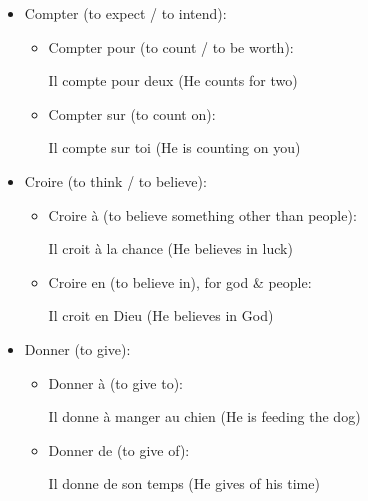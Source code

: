 \documentclass{book}
\begin{document}
\begin{itemize}
            \item Compter (to expect / to intend):
                \begin{itemize}
                    \item Compter pour (to count / to be worth):
                        \begin{center}
                            Il compte pour deux (He counts for two)
                        \end{center}
                    
                    \item Compter sur (to count on):
                        \begin{center}
                            Il compte sur toi (He is counting on you)
                        \end{center}
                \end{itemize}
            
            \item Croire (to think / to believe):
                \begin{itemize}
                    \item Croire à (to believe something other than people):
                        \begin{center}
                            Il croit à la chance (He believes in luck)
                        \end{center}
                    
                    \item Croire en (to believe in), for god \& people:
                        \begin{center}
                            Il croit en Dieu (He believes in God)
                        \end{center}
                \end{itemize}
            
            \item Donner (to give):
                \begin{itemize}
                    \item Donner à (to give to):
                        \begin{center}
                            Il donne à manger au chien (He is feeding the dog)
                        \end{center}
                    
                    \item Donner de (to give of):
                        \begin{center}
                            Il donne de son temps (He gives of his time)
                        \end{center}
                    

\end{itemize}
\end{itemize}
\end{document}

